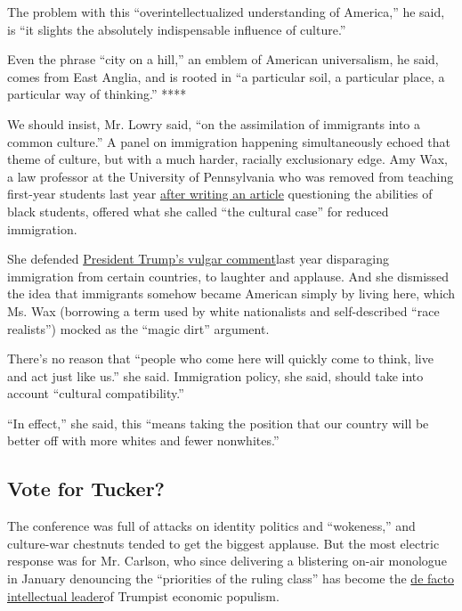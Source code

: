 The problem with this ``overintellectualized understanding of America,''
he said, is ``it slights the absolutely indispensable influence of
culture.''

Even the phrase ``city on a hill,'' an emblem of American universalism,
he said, comes from East Anglia, and is rooted in ``a particular soil, a
particular place, a particular way of thinking.'' ****

We should insist, Mr. Lowry said, ``on the assimilation of immigrants
into a common culture.'' A panel on immigration happening simultaneously
echoed that theme of culture, but with a much harder, racially
exclusionary edge. Amy Wax, a law professor at the University of
Pennsylvania who was removed from teaching first-year students last year
\href{https://www.vox.com/policy-and-politics/2018/3/21/17143150/conservative-scientific-racism-national-review}{after
writing an article} questioning the abilities of black students, offered
what she called ``the cultural case'' for reduced immigration.

She defended
\href{https://www.nytimes3xbfgragh.onion/2018/01/11/us/politics/trump-shithole-countries.html}{President
Trump's vulgar comment}last year disparaging immigration from certain
countries, to laughter and applause. And she dismissed the idea that
immigrants somehow became American simply by living here, which Ms. Wax
(borrowing a term used by white nationalists and self-described ``race
realists'') mocked as the ``magic dirt'' argument.

There's no reason that ``people who come here will quickly come to
think, live and act just like us.'' she said. Immigration policy, she
said, should take into account ``cultural compatibility.''

``In effect,'' she said, this ``means taking the position that our
country will be better off with more whites and fewer nonwhites.''

\hypertarget{vote-for-tucker}{%
\subsection{Vote for Tucker?}\label{vote-for-tucker}}

The conference was full of attacks on identity politics and
``wokeness,'' and culture-war chestnuts tended to get the biggest
applause. But the most electric response was for Mr. Carlson, who since
delivering a blistering on-air monologue in January denouncing the
``priorities of the ruling class'' has become the
\href{https://www.nytimes3xbfgragh.onion/2019/01/12/opinion/sunday/tucker-carlson-fox-news-republicans.html?module=inline}{de
facto intellectual leader}of Trumpist economic populism.

